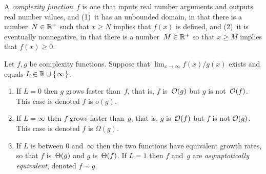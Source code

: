 \documentclass[answers, nolegalese, 11pt]{examjh}
\begin{document}
\thispagestyle{empty}
\vspace{-1ex}
\makebox[\textwidth]{\hbox{}\hrulefill\hbox{}}


A \textit{complexity function}~$f$ 
is one that inputs real number arguments and outputs real 
number values, and
(1)~it has an unbounded domain, in that there is a number~$N\in\mathbb{R}^+$
such that $x\geq N$ implies that $f(x)$ is defined, and
(2)~it is eventually nonnegative, in that
there is a number~$M\in\mathbb{R}^+$ so that
$x\geq M$ implies that $f(x)\geq 0$.

  Let $f,g$ be complexity functions. 
  Suppose that 
  $\lim_{x\to\infty}f(x)/g(x)$ exists and equals $L\in\R\cup\set{\infty}$.
\begin{enumerate}
  \item If $L=0$ then $g$ grows faster than~$f$,
    that is, $f$ is~$\operatorname*{\mathcal{O}}(g)$ but $g$ is not~$\operatorname*{\mathcal{O}}(f)$.
  This case is denoted
  $f$ is $o(g)$.
  \item If $L=\infty$ then $f$ grows faster than~$g$,
    that is, $g$ is~$\operatorname*{\mathcal{O}}(f)$ but $f$ is not $\operatorname*{\mathcal{O}}(g)$.
This case is denoted
  $f$ is $\Omega(g)$.  
\item 
  If $L$ is between $0$ and~$\infty$   
  then the two functions have equivalent growth rates,
    so that $f$ is~$\Theta(g)$ and $g$ is~$\Theta(f)$.
If $L=1$ then $f$ and~$g$ are \textit{asymptotically equivalent},
  denoted $f\sim g$.
  \end{enumerate}
\end{document}
